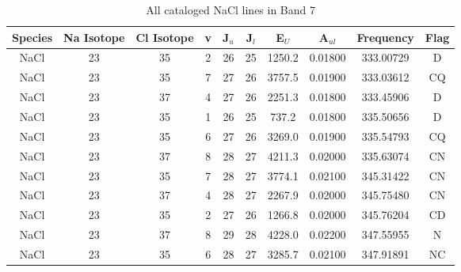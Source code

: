 \begin{table*}[htp]
\centering
\caption{All cataloged NaCl lines in Band 7}
\begin{tabular}{cccccccccc}
\label{tab:Na_detections_B7}
Species & Na Isotope & Cl Isotope & v & J$_u$ & J$_l$ & E$_U$ & A$_{ul}$ & Frequency & Flag \\
\hline
NaCl & 23 & 35 & 2 & 26 & 25 & 1250.2 & 0.01800 & 333.00729 & D \\
NaCl & 23 & 35 & 7 & 27 & 26 & 3757.5 & 0.01900 & 333.03612 & CQ \\
NaCl & 23 & 37 & 4 & 27 & 26 & 2251.3 & 0.01800 & 333.45906 & D \\
NaCl & 23 & 35 & 1 & 26 & 25 & 737.2 & 0.01800 & 335.50656 & D \\
NaCl & 23 & 35 & 6 & 27 & 26 & 3269.0 & 0.01900 & 335.54793 & CQ \\
NaCl & 23 & 37 & 8 & 28 & 27 & 4211.3 & 0.02000 & 335.63074 & CN \\
NaCl & 23 & 35 & 7 & 28 & 27 & 3774.1 & 0.02100 & 345.31422 & CN \\
NaCl & 23 & 37 & 4 & 28 & 27 & 2267.9 & 0.02000 & 345.75480 & CN \\
NaCl & 23 & 35 & 2 & 27 & 26 & 1266.8 & 0.02000 & 345.76204 & CD \\
NaCl & 23 & 37 & 8 & 29 & 28 & 4228.0 & 0.02200 & 347.55955 & N \\
NaCl & 23 & 35 & 6 & 28 & 27 & 3285.7 & 0.02100 & 347.91891 & NC \\
\hline
\end{tabular}

\par 
\end{table*}
